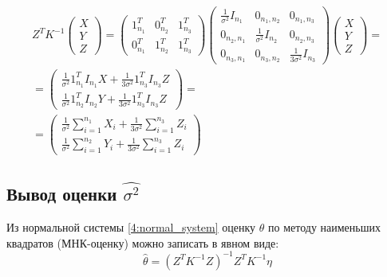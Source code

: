 \begin{multline}
    Z^T K^{-1}
    \begin{pmatrix}
        X \\
        Y \\
        Z
    \end{pmatrix}
    =
    \begin{pmatrix}
        1_{n_1}^T & 0_{n_2}^T & 1_{n_3}^T \\
        0_{n_1}^T & 1_{n_2}^T & 1_{n_3}^T
    \end{pmatrix}
    \begin{pmatrix}
        \frac{1}{\sigma^2} I_{n_1} & 0_{n_1,n_2}                & 0_{n_1,n_3}                  \\
        0_{n_2,n_1}                & \frac{1}{\sigma^2} I_{n_2} & 0_{n_2,n_3}                  \\
        0_{n_3,n_1}                & 0_{n_3,n_2}                & \frac{1}{3 \sigma^2} I_{n_3}
    \end{pmatrix}
    \begin{pmatrix}
        X \\
        Y \\
        Z
    \end{pmatrix} = \\
    = \begin{pmatrix}
          \frac{1}{\sigma^2} 1_{n_1}^T I_{n_1} X + \frac{1}{3 \sigma^2} 1_{n_3}^T I_{n_3} Z \\
          \frac{1}{\sigma^2} 1_{n_2}^T I_{n_2} Y + \frac{1}{3 \sigma^2} 1_{n_3}^T I_{n_3} Z
    \end{pmatrix} = \\
    = \begin{pmatrix}
          \frac{1}{\sigma^2} \sum_{i=1}^{n_1} X_i + \frac{1}{3 \sigma^2} \sum_{i=1}^{n_3} Z_i \\
          \frac{1}{\sigma^2} \sum_{i=1}^{n_2} Y_i + \frac{1}{3 \sigma^2} \sum_{i=1}^{n_3} Z_i
    \end{pmatrix}
\end{multline}

\subsection*{Вывод оценки $\widehat{\sigma^2}$}

Из нормальной системы \eqref{4:normal_system} оценку $\theta$ по методу наименьших квадратов (МНК-оценку) можно записать в явном виде:
\begin{equation}
    \widehat{\theta} = \left ( Z^T K^{-1} Z \right )^{-1} Z^T K^{-1} \eta
\end{equation}

